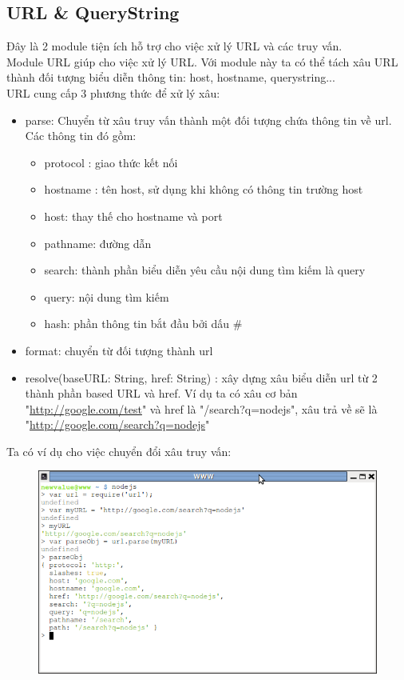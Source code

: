 \subsection{URL \& QueryString}
	Đây là 2 module tiện ích hỗ trợ cho việc xử lý URL và các truy vấn. \\
	Module URL giúp cho việc xử lý URL. Với module này ta có thể tách xâu URL thành đối tượng biểu diễn thông tin: host, hostname, querystring... \\
	URL cung cấp 3 phương thức để xử lý xâu:
		\begin{itemize}
			\item parse: Chuyển từ xâu truy vấn thành một đối tượng chứa thông tin về url. Các thông tin đó gồm:
			\begin{itemize}
				\item protocol : giao thức kết nối
				\item hostname : tên host, sử dụng khi không có thông tin trường host
				\item host: thay thế cho hostname và port
				\item pathname: đường dẫn
				\item search:  thành phần biểu diễn yêu cầu nội dung tìm kiếm là query
				\item query: nội dung tìm kiếm
				\item hash: phần thông tin bắt đầu bởi dấu \#
			\end{itemize}
			\item format: chuyển từ đối tượng thành url
			\item resolve(baseURL: String, href: String) : xây dựng xâu biểu diễn url từ 2 thành phần based URL và href. Ví dụ ta có xâu cơ bản "\url{http://google.com/test}" và href là "/search?q=nodejs", xâu trả về sẽ là "\url{http://google.com/search?q=nodejs}" 
		\end{itemize}
	Ta có ví dụ cho việc chuyển đổi xâu truy vấn:\\
	
	\begin{figure}[h]
		\centering
		\includegraphics[scale=0.7]{3_3_7}	
	\end{figure}

